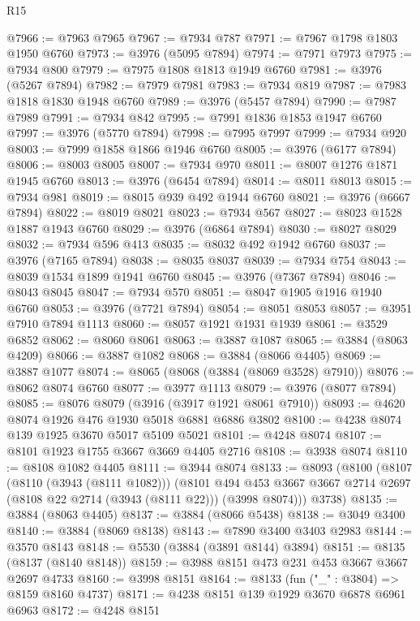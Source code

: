 \begin{lexlean}{R15}
\begin{coremodule}
@7966 := @7963 @7965
@7967 := @7934 @787
@7971 := @7967 @1798 @1803 @1950 @6760
@7973 := @3976 (@5095 @7894)
@7974 := @7971 @7973
@7975 := @7934 @800
@7979 := @7975 @1808 @1813 @1949 @6760
@7981 := @3976 (@5267 @7894)
@7982 := @7979 @7981
@7983 := @7934 @819
@7987 := @7983 @1818 @1830 @1948 @6760
@7989 := @3976 (@5457 @7894)
@7990 := @7987 @7989
@7991 := @7934 @842
@7995 := @7991 @1836 @1853 @1947 @6760
@7997 := @3976 (@5770 @7894)
@7998 := @7995 @7997
@7999 := @7934 @920
@8003 := @7999 @1858 @1866 @1946 @6760
@8005 := @3976 (@6177 @7894)
@8006 := @8003 @8005
@8007 := @7934 @970
@8011 := @8007 @1276 @1871 @1945 @6760
@8013 := @3976 (@6454 @7894)
@8014 := @8011 @8013
@8015 := @7934 @981
@8019 := @8015 @939 @492 @1944 @6760
@8021 := @3976 (@6667 @7894)
@8022 := @8019 @8021
@8023 := @7934 @567
@8027 := @8023 @1528 @1887 @1943 @6760
@8029 := @3976 (@6864 @7894)
@8030 := @8027 @8029
@8032 := @7934 @596 @413
@8035 := @8032 @492 @1942 @6760
@8037 := @3976 (@7165 @7894)
@8038 := @8035 @8037
@8039 := @7934 @754
@8043 := @8039 @1534 @1899 @1941 @6760
@8045 := @3976 (@7367 @7894)
@8046 := @8043 @8045
@8047 := @7934 @570
@8051 := @8047 @1905 @1916 @1940 @6760
@8053 := @3976 (@7721 @7894)
@8054 := @8051 @8053
@8057 := @3951 @7910 @7894 @1113
@8060 := @8057 @1921 @1931 @1939
@8061 := @3529 @6852
@8062 := @8060 @8061
@8063 := @3887 @1087
@8065 := @3884 (@8063 @4209)
@8066 := @3887 @1082
@8068 := @3884 (@8066 @4405)
@8069 := @3887 @1077
@8074 := @8065 (@8068 (@3884 (@8069 @3528) @7910))
@8076 := @8062 @8074 @6760
@8077 := @3977 @1113
@8079 := @3976 (@8077 @7894)
@8085 := @8076 @8079 (@3916 (@3917 @1921 @8061 @7910))
@8093 := @4620 @8074 @1926 @476 @1930 @5018 @6881 @6886 @3802
@8100 := @4238 @8074 @139 @1925 @3670 @5017 @5109 @5021
@8101 := @4248 @8074
@8107 := @8101 @1923 @1755 @3667 @3669 @4405 @2716
@8108 := @3938 @8074
@8110 := @8108 @1082 @4405
@8111 := @3944 @8074
@8133 := @8093
    (@8100
      (@8107
        (@8110 (@3943 (@8111 @1082)))
        (@8101
          @494
          @453
          @3667
          @3667
          @2714
          @2697
          (@8108 @22 @2714 (@3943 (@8111 @22)))
          (@3998 @8074)))
      @3738)
@8135 := @3884 (@8063 @4405)
@8137 := @3884 (@8066 @5438)
@8138 := @3049 @3400
@8140 := @3884 (@8069 @8138)
@8143 := @7890 @3400 @3403 @2983
@8144 := @3570 @8143
@8148 := @5530 (@3884 (@3891 @8144) @3894)
@8151 := @8135 (@8137 (@8140 @8148))
@8159 := @3988 @8151 @473 @231 @453 @3667 @3667 @2697 @4733
@8160 := @3998 @8151
@8164 := @8133 (fun ("_" : @3804) => @8159 @8160 @4737)
@8171 := @4238 @8151 @139 @1929 @3670 @6878 @6961 @6963
@8172 := @4248 @8151

\end{coremodule}
\end{lexlean}
